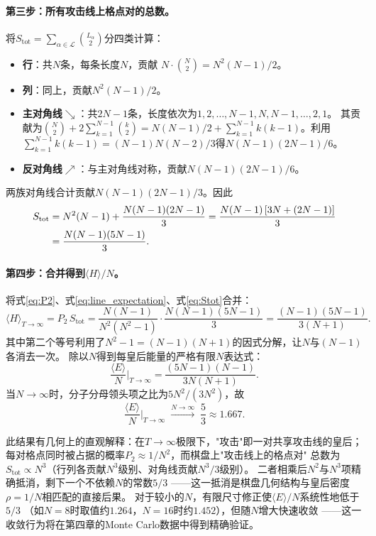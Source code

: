 \paragraph{第三步：所有攻击线上格点对的总数。}
将$S_{\text{tot}}=\sum_{\alpha\in\mathcal{L}}\binom{L_{\alpha}}{2}$分四类计算：
%
\begin{itemize}
  \item \textbf{行}：共$N$条，每条长度$N$，贡献
        $N\cdot\binom{N}{2}=N^{2}(N-1)/2$。
  \item \textbf{列}：同上，贡献$N^{2}(N-1)/2$。
  \item \textbf{主对角线$\searrow$}：共$2N-1$条，长度依次为$1,2,\ldots,N-1,N,N-1,\ldots,2,1$。
        其贡献为$\binom{N}{2}+2\sum_{k=1}^{N-1}\binom{k}{2}
        =N(N-1)/2+\sum_{k=1}^{N-1}k(k-1)$。利用
        $\sum_{k=1}^{N-1}k(k-1)=(N-1)N(N-2)/3$得$N(N-1)(2N-1)/6$。
  \item \textbf{反对角线$\nearrow$}：与主对角线对称，贡献$N(N-1)(2N-1)/6$。
\end{itemize}
%
两族对角线合计贡献$N(N-1)(2N-1)/3$。因此
%
\begin{align}
  S_{\text{tot}} &= N^{2}(N-1) + \frac{N(N-1)(2N-1)}{3}
                   = \frac{N(N-1)\,[3N + (2N-1)]}{3} \notag\\
                  &= \frac{N(N-1)(5N-1)}{3}.
  \label{eq:Stot}
\end{align}

\paragraph{第四步：合并得到$\langle H\rangle/N$。}
将式\ref{eq:P2}、式\ref{eq:line_expectation}、式\ref{eq:Stot}合并：
%
\begin{equation}
  \langle H\rangle_{T\to\infty}
   = P_{2}\,S_{\text{tot}}
   = \frac{N(N-1)}{N^{2}(N^{2}-1)}\cdot\frac{N(N-1)(5N-1)}{3}
   = \frac{(N-1)(5N-1)}{3(N+1)}.
\end{equation}
%
其中第二个等号利用了$N^{2}-1=(N-1)(N+1)$的因式分解，让$N$与$(N-1)$各消去一次。
除以$N$得到每皇后能量的严格有限$N$表达式：
%
\begin{equation}
  \frac{\langle E\rangle}{N}\bigg|_{T\to\infty}
  = \frac{(5N-1)(N-1)}{3N(N+1)}.
  \label{eq:E_highT}
\end{equation}
%
当$N\to\infty$时，分子分母领头项之比为$5N^{2}/(3N^{2})$，故
%
\begin{equation}
  \frac{\langle E\rangle}{N}\bigg|_{T\to\infty}
  \;\xrightarrow{N\to\infty}\;\frac{5}{3}\approx1.667.
\end{equation}

此结果有几何上的直观解释：在$T\to\infty$极限下，"攻击"即一对共享攻击线的皇后；
每对格点同时被占据的概率$P_{2}\approx1/N^{2}$，而棋盘上"攻击线上的格点对"
总数为$S_{\text{tot}}\propto N^{3}$（行列各贡献$N^{3}$级别、对角线贡献$N^{3}/3$级别）。
二者相乘后$N^{2}$与$N^{3}$项精确抵消，剩下一个不依赖$N$的常数$5/3$
——这一抵消是棋盘几何结构与皇后密度$\rho=1/N$相匹配的直接后果。
对于较小的$N$，有限尺寸修正使$\langle E\rangle/N$系统性地低于$5/3$
（如$N=8$时取值约$1.264$，$N=16$时约$1.452$），但随$N$增大快速收敛
——这一收敛行为将在第四章的Monte Carlo数据中得到精确验证。
